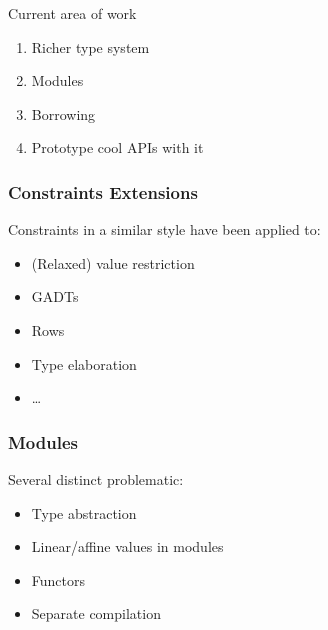 \documentclass[xcolor=svgnames,11pt]{beamer}
\begin{document}
\begin{frame}{Current area of work}

  \begin{enumerate}
  \item Richer type system
  \item Modules
  \item Borrowing
  \item Prototype cool APIs with it
  \end{enumerate}
  
\end{frame}

\begin{frame}
  \frametitle{Constraints \hfill Extensions}
  Constraints in a similar style have been applied to:
  \begin{itemize}
  \item (Relaxed) value restriction
  \item GADTs
  \item Rows
  \item Type elaboration
  \item \dots
  \end{itemize}
\end{frame}

\begin{frame}
  \frametitle{Modules}

  Several distinct problematic:
  \begin{itemize}
  \item \alert<2>{Type abstraction} 
  \item \alert<3>{Linear/affine values in modules} 
  \item \alert<4>{Functors}
  \item \alert<5->{Separate compilation}
  \end{itemize}
  
\end{frame}
\end{document}
